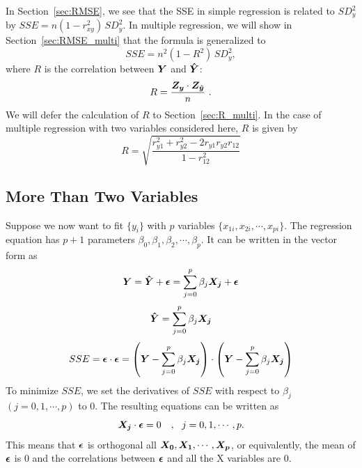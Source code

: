 \documentclass[11pt]{article}
\newcommand{\beq}{\begin{equation}}
\newcommand{\eeq}{\end{equation}}
\newcommand{\ve}[1]{\mbox{\boldmath $#1$}}
\begin{document}
In Section~\ref{sec:RMSE}, we see that the SSE in simple regression is related 
to $SD_y^2$ by 
$SSE = n(1-r_{xy}^2)\, SD_y^2$. In multiple regression, we will show 
in Section~\ref{sec:RMSE_multi} that the formula is generalized to 
\[
  SSE = n^2(1-R^2)\, SD_y^2 ,
\]
where $R$ is the correlation between $\ve{Y}$ and $\ve{\hat{Y}}$: 
\[
  R = \frac{\ve{Z_y} \cdot \ve{Z_{\hat{y}}}}{n}  \ .
\]
We will defer the calculation of $R$ to Section~\ref{sec:R_multi}. 
In the case of multiple regression with two variables considered here, 
$R$ is given by 
\beq
  \boxed{ R = \sqrt{ \frac{r_{y1}^2 +r_{y2}^2 - 2r_{y1}r_{y2} r_{12}}{1-r_{12}^2}} }
\label{eq:R_2vars}
\eeq

\subsection{More Than Two Variables}
\label{sec:multiVars}

Suppose we now want to fit $\{ y_i \}$ with $p$ variables 
$\{x_{1i}, x_{2i}, \cdots, x_{pi} \}$. The regression equation 
has $p+1$ parameters $\beta_0,\beta_1,\beta_2,\cdots, \beta_p$. 
It can be written in the vector form as 
\beq
  \ve{Y} = \ve{\hat{Y}} + \ve{\epsilon} = \sum_{j=0}^p \beta_j \ve{X_j} + \ve{\epsilon} 
\label{eq:epsilon_multi}
\eeq
\beq
  \ve{\hat{Y}} = \sum_{j=0}^p \beta_j \ve{X_j} 
\label{eq:Yhat_multi}
\eeq
\beq
  SSE = \ve{\epsilon} \cdot \ve{\epsilon} = \left( \ve{Y} - \sum_{j=0}^p \beta_j \ve{X_j} 
\right) \cdot \left( \ve{Y} - \sum_{j=0}^p \beta_j \ve{X_j} \right) 
\label{eq:SSE_multi}
\eeq
To minimize $SSE$, we set the derivatives of $SSE$ with respect to 
$\beta_j$ $(j=0,1,\cdots,p)$ to 0. The resulting equations can be written as 
\beq
  \ve{X_j} \cdot \ve{\epsilon} = 0 \ \ \ , \ \ j=0,1,\cdots, p.
\label{eq:regres_multi}
\eeq
This means that $\ve{\epsilon}$ is orthogonal all $\ve{X_0},\ve{X_1},\cdots,\ve{X_p}$, 
or equivalently, the mean of $\ve{\epsilon}$ is 0 and the correlations 
between $\ve{\epsilon}$ and all the X variables are 0. 
\end{document}
